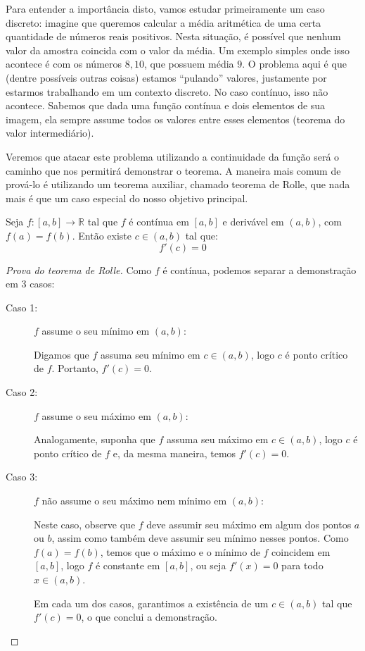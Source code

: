 	Para entender a importância disto, vamos estudar primeiramente um caso discreto: imagine que queremos calcular a média aritmética de uma certa quantidade de números reais positivos. Nesta situação, é possível que nenhum valor da amostra coincida com o valor da média. Um exemplo simples onde isso acontece é com os números $8,10$, que possuem média $9$. O problema aqui é que (dentre possíveis outras coisas) estamos ``pulando'' valores, justamente por estarmos trabalhando em um contexto discreto. No caso contínuo, isso não acontece. Sabemos que dada uma função contínua e dois elementos de sua imagem, ela sempre assume todos os valores entre esses elementos (teorema do valor intermediário).
	
	Veremos que atacar este problema utilizando a continuidade da função será o caminho que nos permitirá demonstrar o teorema. A maneira mais comum de prová-lo é utilizando um teorema auxiliar, chamado teorema de Rolle, que nada mais é que um caso especial do nosso objetivo principal.
	\begin{teo}
		Seja $f:[a,b]\to \mathbb{R}$ tal que $f$ é contínua em $[a,b]$ e derivável em $(a,b)$, com $f(a) = f(b)$. Então existe $c \in (a,b)$ tal que:
		$$f'(c) = 0$$
	\end{teo}
	\begin{proof}[Prova do teorema de Rolle]
		Como $f$ é contínua, podemos separar a demonstração em 3 casos:
		\begin{description}
			\item[Caso 1:] $f$ assume o seu mínimo em $(a,b)$:
		
			Digamos que $f$ assuma seu mínimo em $c \in (a,b)$, logo $c$ é ponto crítico de $f$. Portanto, $f'(c)=0$.
			\item[Caso 2:] $f$ assume o seu máximo em $(a,b)$:
			
			Analogamente, suponha que $f$ assuma seu máximo em $c \in (a,b)$, logo $c$ é ponto crítico de $f$ e, da mesma maneira, temos $f'(c)=0$.
			\item[Caso 3:] $f$ não assume o seu máximo nem mínimo em $(a,b)$:
			
			Neste caso, observe que $f$ deve assumir seu máximo em algum dos pontos $a$ ou $b$, assim como também deve assumir seu mínimo nesses pontos. Como $f(a) = f(b)$, temos que o máximo e o mínimo de $f$ coincidem em $[a,b]$, logo $f$ é constante em $[a,b]$, ou seja $f'(x)=0$ para todo $x \in (a,b)$.
			
			Em cada um dos casos, garantimos a existência de um $c\in(a,b)$ tal que $f'(c) =0$, o que conclui a demonstração.
		\end{description}
	\end{proof}
	
